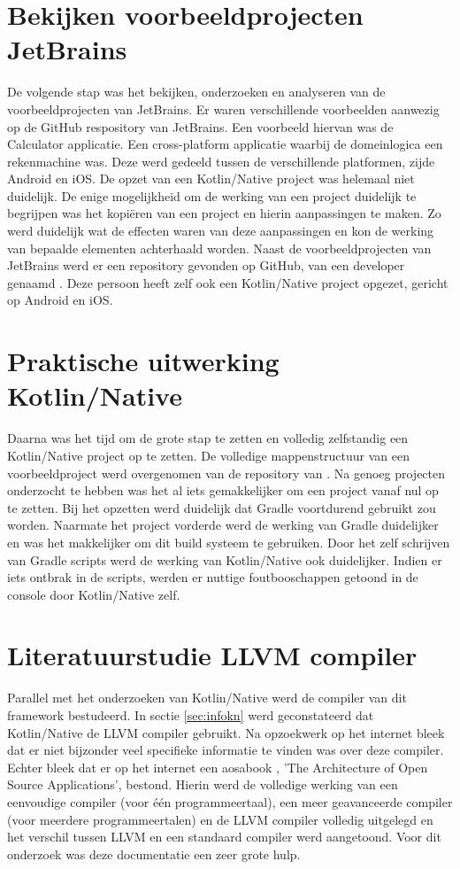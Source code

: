 \section{Bekijken voorbeeldprojecten JetBrains}
De volgende stap was het bekijken, onderzoeken en analyseren van de voorbeeldprojecten van JetBrains. Er waren verschillende voorbeelden aanwezig op de GitHub respository van JetBrains. Een voorbeeld hiervan was de Calculator applicatie. Een cross-platform applicatie waarbij de domeinlogica een rekenmachine was. Deze werd gedeeld tussen de verschillende platformen, zijde Android en iOS. De opzet van een Kotlin/Native project was helemaal niet duidelijk. De enige mogelijkheid om de werking van een project duidelijk te begrijpen was het kopiëren van een project en hierin aanpassingen te maken. Zo werd duidelijk wat de effecten waren van deze aanpassingen en kon de werking van bepaalde elementen achterhaald worden. Naast de voorbeeldprojecten van JetBrains werd er een repository gevonden op GitHub, van een developer genaamd \textcite{AlbertGao}. Deze persoon heeft zelf ook een Kotlin/Native project opgezet, gericht op Android en iOS.

\section{Praktische uitwerking Kotlin/Native}
Daarna was het tijd om de grote stap te zetten en volledig zelfstandig een Kotlin/Native project op te zetten. De volledige mappenstructuur van een voorbeeldproject werd overgenomen van de repository van \textcite{AlbertGao}. Na genoeg projecten onderzocht te hebben was het al iets gemakkelijker om een project vanaf nul op te zetten. Bij het opzetten werd duidelijk dat Gradle voortdurend gebruikt zou worden. Naarmate het project vorderde werd de werking van Gradle duidelijker en was het makkelijker om dit build systeem te gebruiken. Door het zelf schrijven van Gradle scripts werd de werking van Kotlin/Native ook duidelijker. Indien er iets ontbrak in de scripts, werden er nuttige foutbooschappen getoond in de console door Kotlin/Native zelf.

\section{Literatuurstudie LLVM compiler}
Parallel met het onderzoeken van Kotlin/Native werd de compiler van dit framework bestudeerd. In sectie \ref{sec:infokn} werd geconstateerd dat Kotlin/Native de LLVM compiler gebruikt. Na opzoekwerk op het internet bleek dat er niet bijzonder veel specifieke informatie te vinden was over deze compiler. Echter bleek dat er op het internet een aosabook \autocite{aosa}, 'The Architecture of Open Source Applications', bestond. Hierin werd de volledige werking van een eenvoudige compiler (voor één programmeertaal), een meer geavanceerde compiler (voor meerdere programmeertalen) en de LLVM compiler volledig uitgelegd en het verschil tussen LLVM en een standaard compiler werd aangetoond. Voor dit onderzoek was deze documentatie een zeer grote hulp.

